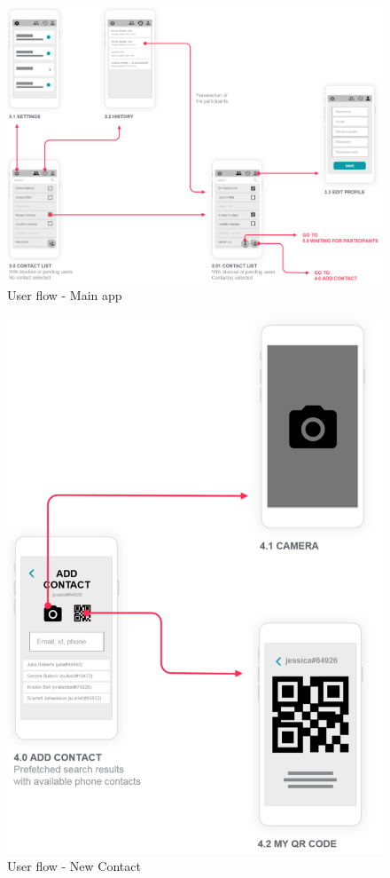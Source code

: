 \documentclass[french]{article}
\begin{document}
	\begin{figure}[H]
		\centering
		\includegraphics[scale=0.55]{../user-flow/user-flow-3.png}
		\caption{User flow - Main app}
		\label{User flow - Main app}
	\end{figure}
	
	\begin{figure}[H]
		\centering
		\includegraphics[scale=0.55]{../user-flow/user-flow-4.png}
		\caption{User flow - New Contact}
		\label{User flow - New Contact}
	\end{figure}
	
\end{document}
